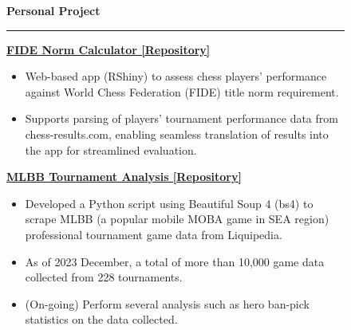\documentclass[a4paper, 10pt]{article}
\newcommand{\rhsWidth}{0.65\textwidth}
\begin{document}
\begin{figure}[h]
\begin{minipage}[t]{\rhsWidth}
	\vspace{1.5em}

	{\Large \faTools \hspace{3pt} \textbf{Personal Project}} \newline
	\rule [6pt]{\linewidth}{1pt}
	\vspace{-15pt}

	\textbf{\href{https://github.com/LiTianYeoh/FIDE_Norm_Calculator}{\color{black} FIDE Norm Calculator [\faGithub \space Repository]}}
	\vspace{-6pt}
	\begin{itemize} [itemsep = 0pt, parsep=2pt]
		\item Web-based app (RShiny) to assess chess players' performance against World Chess Federation (FIDE) title norm requirement. 
		\item Supports parsing of players' tournament performance data from chess-results.com, enabling seamless translation of results into the app for streamlined evaluation.
	\end{itemize}

	\vspace{0.5em}

	\textbf{\href{https://github.com/LiTianYeoh/MLBB_Tournament_Analysis}{\color{black} MLBB Tournament Analysis [\faGithub \space Repository] }}
	\vspace{-6pt}
	\begin{itemize} [itemsep = 0pt, parsep=2pt]
		\item Developed a Python script using Beautiful Soup 4 (bs4) to scrape MLBB (a popular mobile MOBA game in SEA region) professional tournament game data from Liquipedia.
		\item As of 2023 December, a total of more than 10,000 game data collected from 228 tournaments.
		\item (On-going) Perform several analysis such as hero ban-pick statistics on the data collected.
	\end{itemize}
\end{minipage}

\end{figure}
\end{document}
